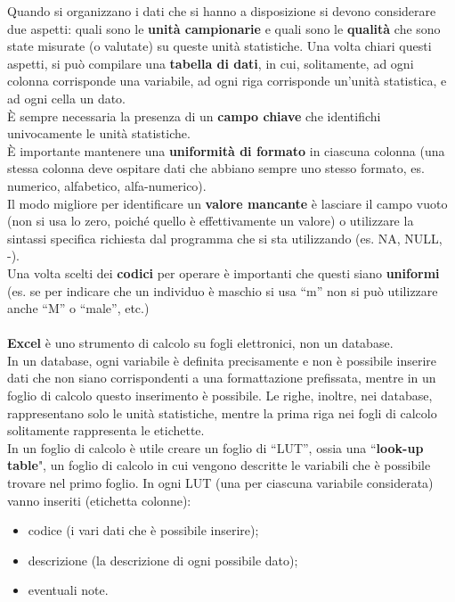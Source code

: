 \documentclass[10pt, draft]{book}
\begin{document}
Quando si organizzano i dati che si hanno a disposizione si devono considerare due aspetti: quali sono le \textbf{unità campionarie} e quali sono le \textbf{qualità} che sono state misurate (o valutate) su queste unità statistiche. Una volta chiari questi aspetti, si può compilare una \textbf{tabella di dati}, in cui, solitamente, ad ogni colonna corrisponde una variabile, ad ogni riga corrisponde un’unità statistica, e ad ogni cella un dato.
\\
È sempre necessaria la presenza di un \textbf{campo chiave} che identifichi univocamente le unità statistiche.
\\
È importante mantenere una \textbf{uniformità di formato} in ciascuna colonna (una stessa colonna deve ospitare dati che abbiano sempre uno stesso formato, es. numerico, alfabetico, alfa-numerico).
\\
Il modo migliore per identificare un \textbf{valore mancante} è lasciare il campo vuoto (non si usa lo zero, poiché quello è effettivamente un valore) o utilizzare la sintassi specifica richiesta dal programma che si sta utilizzando (es. NA, NULL, -).
\\
Una volta scelti dei \textbf{codici} per operare è importanti che questi siano \textbf{uniformi} (es. se per indicare che un individuo è maschio si usa “m” non si può utilizzare anche “M” o “male”, etc.)
\\
\\
\textbf{Excel} è uno strumento di calcolo su fogli elettronici, non un database.
\\
In un database, ogni variabile è definita precisamente e non è possibile inserire dati che non siano corrispondenti a una formattazione prefissata, mentre in un foglio di calcolo questo inserimento è possibile. Le righe, inoltre, nei database, rappresentano solo le unità statistiche, mentre la prima riga nei fogli di calcolo solitamente rappresenta le etichette.
\\
In un foglio di calcolo è utile creare un foglio di “LUT”, ossia una “\textbf{look-up table}", un foglio di calcolo in cui vengono descritte le variabili che è possibile trovare nel primo foglio. In ogni LUT (una per ciascuna variabile considerata) vanno inseriti (etichetta colonne):
\begin{itemize}
    \item codice (i vari dati che è possibile inserire);
    \item descrizione (la descrizione di ogni possibile dato);
    \item eventuali note.
\end{itemize}
\end{document}
